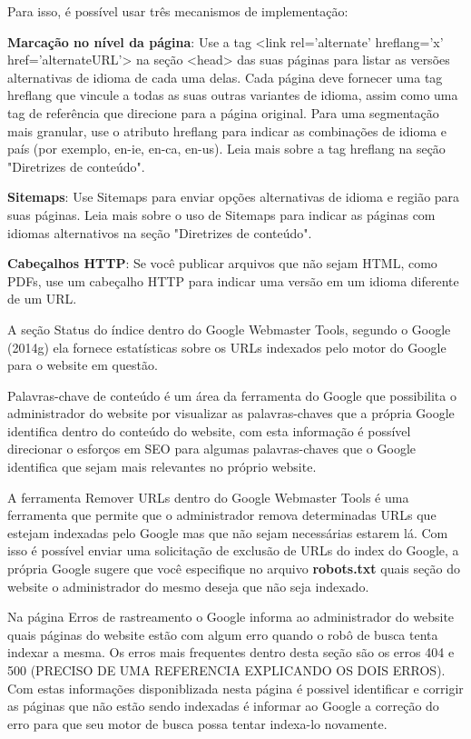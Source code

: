 \documentclass[
	12pt,				%
	openright,			%
	twoside,			%
	a4paper,			%
	english,			%
	french,				%
	spanish,			%
	brazil				%
	]{abntex2}
\begin{document}
\begin{citacao}
Para isso, é possível usar três mecanismos de implementação:
\item \textbf{Marcação no nível da página}: Use a tag <link rel='alternate' hreflang='x' href='alternateURL'> na seção <head> das suas páginas para listar as versões alternativas de idioma de cada uma delas. Cada página deve fornecer uma tag hreflang que vincule a todas as suas outras variantes de idioma, assim como uma tag de referência que direcione para a página original. Para uma segmentação mais granular, use o atributo hreflang para indicar as combinações de idioma e país (por exemplo, en-ie, en-ca, en-us). Leia mais sobre a tag hreflang  na seção "Diretrizes de conteúdo".  
\item \textbf{Sitemaps}: Use Sitemaps para enviar opções alternativas de idioma e região para suas páginas. Leia mais sobre o uso de Sitemaps para indicar as páginas com idiomas alternativos na seção "Diretrizes de conteúdo".
\item \textbf{Cabeçalhos HTTP}: Se você publicar arquivos que não sejam HTML, como PDFs, use um cabeçalho HTTP para indicar uma versão em um idioma diferente de um URL.
\end{citacao}

A seção Status do índice dentro do Google Webmaster Tools, segundo o Google (2014g) ela fornece estatísticas sobre os URLs indexados pelo motor do Google para o website em questão.

Palavras-chave de conteúdo é um área da ferramenta do Google que possibilita o administrador do website por visualizar as palavras-chaves que a própria Google identifica dentro do conteúdo do website, com esta informação é possível direcionar o esforços em SEO para algumas palavras-chaves que o Google identifica que sejam mais relevantes no próprio website.

A ferramenta Remover URLs dentro do Google Webmaster Tools é uma ferramenta que permite que o administrador remova determinadas URLs que estejam indexadas pelo Google mas que não sejam necessárias estarem lá. Com isso é possível enviar uma solicitação de exclusão de URLs do index do Google, a própria Google sugere que você especifique no arquivo \textbf{robots.txt} quais seção do website o administrador do mesmo deseja que não seja indexado.

Na página Erros de rastreamento o Google informa ao administrador do website quais páginas do website estão com algum erro quando o robô de busca tenta indexar a mesma. Os erros mais frequentes dentro desta seção são os erros 404 e 500 (PRECISO DE UMA REFERENCIA EXPLICANDO OS DOIS ERROS). Com estas informações disponiblizada nesta página é possivel identificar e corrigir as páginas que não estão sendo indexadas é informar ao Google a correção do erro para que seu motor de busca possa tentar indexa-lo novamente.
\end{document}
